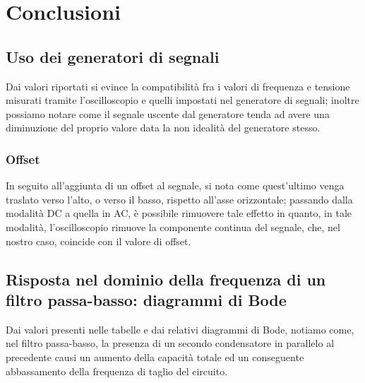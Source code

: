 \documentclass[a4paper]{article}
\begin{document}
	\section{Conclusioni}
		\subsection{Uso dei generatori di segnali}
			Dai valori riportati si evince la compatibilità fra i valori di frequenza e tensione misurati tramite l'oscilloscopio e quelli impostati nel generatore di segnali; inoltre possiamo notare come il segnale uscente dal generatore tenda ad avere una diminuzione del proprio valore data la non idealità del generatore stesso.
			\subsubsection{Offset}
				In seguito all’aggiunta di un offset al segnale, si nota come quest’ultimo venga traslato verso l’alto, o verso il basso, rispetto all’asse orizzontale; passando dalla modalità DC a quella in AC, è possibile rimuovere tale effetto in quanto, in tale modalità, l’oscilloscopio rimuove la componente continua del segnale, che, nel nostro caso, coincide con il valore di offset.
		\subsection{Risposta nel dominio della frequenza di un filtro passa-basso: diagrammi di Bode}
			Dai valori presenti nelle tabelle e dai relativi diagrammi di Bode, notiamo come, nel filtro passa-basso, la presenza di un secondo condensatore in parallelo al precedente causi un aumento della capacità totale ed un conseguente abbassamento della frequenza di taglio del circuito.
\end{document}
